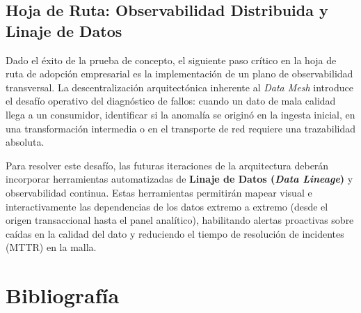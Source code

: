 \documentclass[12pt, a4paper]{article}
\begin{document}
\subsection{Hoja de Ruta: Observabilidad Distribuida y Linaje de Datos}

Dado el éxito de la prueba de concepto, el siguiente paso crítico en la hoja de ruta de adopción empresarial es la implementación de un plano de observabilidad transversal. La descentralización arquitectónica inherente al \textit{Data Mesh} introduce el desafío operativo del diagnóstico de fallos: cuando un dato de mala calidad llega a un consumidor, identificar si la anomalía se originó en la ingesta inicial, en una transformación intermedia o en el transporte de red requiere una trazabilidad absoluta.

Para resolver este desafío, las futuras iteraciones de la arquitectura deberán incorporar herramientas automatizadas de \textbf{Linaje de Datos (\textit{Data Lineage})} y observabilidad continua. Estas herramientas permitirán mapear visual e interactivamente las dependencias de los datos extremo a extremo (desde el origen transaccional hasta el panel analítico), habilitando alertas proactivas sobre caídas en la calidad del dato y reduciendo el tiempo de resolución de incidentes (MTTR) en la malla.


\section{Bibliografía}
\end{document}
